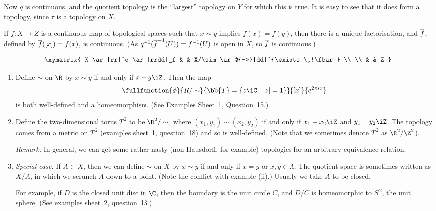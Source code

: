 \begin{remark}
	Now $q$ is continuous, and the quotient topology is the ``largest'' topology on $Y$ for which this is true. It is easy to see that it does form a topology, since $\tau$ is a topology on $X$. \label{rmk:quot-topologies}

	If $f:X\to Z$ is a continuous map of topological spaces such that $x\sim y$ implies $f(x)=f(y)$, then there is a unique factorisation, and $\overline{f}$, defined by $\overline{f}([x]) = f(x)$, is continuous. (As $q^{-1}(\overline{f}^{-1}(U)) = f^{-1}(U)$ is open in $X$, so $\overline{f}$ is continuous.)

	\begin{equation*}
		\xymatrix{
			X \ar[rr]^q \ar[rrdd]_f & & X/\sim \ar@{-->}[dd]^{\exists\,!\fbar} \\
			\\
			& & Z
		}
	\end{equation*}
\end{remark}

\begin{examples}
\mbox{}
\begin{enumerate}
	\item Define $\sim$ on $\R$ by $x\sim y$ if and only if $x-y\iZ$. Then the map
	\begin{equation*}
		\fullfunction{\phi}{R/\sim}{\bb{T} = \{z\iC: \left\vert z \right\vert=1\}}{[x]}{e^{2\pi ix}}
	\end{equation*}
	is both well-defined and a homeomorphism. (See Examples Sheet~1, Question~15.)

	\item Define the two-dimensional torus $T^{\,2}$ to be $\R^2/\sim$, where $(x_1,y_1) \sim (x_2,y_2)$ if and only if $x_1-x_2 \iZ$ and $y_1-y_2\iZ$. The topology comes from a metric on $T^{\,2}$ (examples sheet~1, question~18) and so is well-defined. (Note that we sometimes denote $T^{\,2}$ as $\R^2/\Z^2$).

	\emph{Remark.} In general, we can get some rather nasty (non-Hausdorff, for example) topologies for an arbitrary equivalence relation.

	\item \emph{Special case.} If $A\subset X$, then we can define $\sim$ on $X$ by $x \sim y$ if and only if $x=y$ or $x,y\in A$. The quotient space is sometimes written as $X/A$, in which we scrunch $A$ down to a point. (Note the conflict with example (ii).) Usually we take $A$ to be closed.

	For example, if $D$ is the closed unit disc in $\C$, then the boundary is the unit circle $C$, and $D/C$ is homeomorphic to $S^{\,2}$, the unit sphere. (See examples sheet~2, question~13.)
\end{enumerate}
\end{examples}

